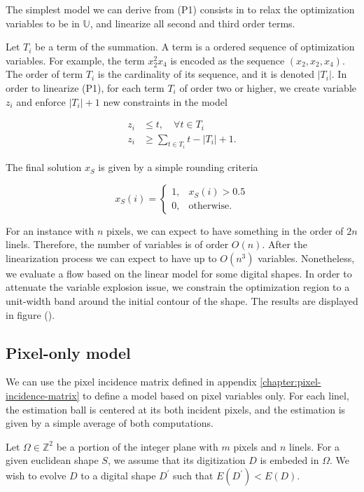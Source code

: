 	The simplest model we can derive from (P1) consists in to relax the optimization variables to be in $\mathbb{U}$, and linearize all second and third order terms. 
	
	Let $T_i$ be a term of the summation. A term is a ordered sequence of optimization variables. For example, the term $x_2^2x_4$ is encoded as the sequence $(x_2,x_2,x_4)$. The order of term $T_i$ is the cardinality of its sequence, and it is denoted $|T_i|$. In order to linearize (P1), for each term $T_i$ of order two or higher, we create variable $z_i$ and enforce $|T_i|+1$ new constraints in the model
	
	\begin{align*}
		z_i &\leq t, \quad \forall t \in T_i \\
		z_i &\geq \sum_{t \in T_i}{t} - |T_i| + 1.		
	\end{align*}

	The final solution $x_S$ is given by a simple rounding criteria
	
\[
	x_S(i) = \left\{ \begin{array}{ll}

		 	1,& x_S(i) > 0.5\\
		 	0,& \text{otherwise}.
 	
	\end{array}\right.
\]	

	For an instance with $n$ pixels, we can expect to have something in the order of $2n$ linels. Therefore, the number of variables is of order $O(n)$. After the linearization process we can expect to have up to $O(n^3)$ variables. Nonetheless, we evaluate a flow based on the linear model for some digital shapes. In order to attenuate the variable explosion issue, we constrain the optimization region to a unit-width band around the initial contour of the shape. The results are displayed in figure ().
	


\subsection{Pixel-only model}

We can use the pixel incidence matrix defined in appendix \ref{chapter:pixel-incidence-matrix} to define a model based on pixel variables only. For each linel, the estimation ball is centered at its both incident pixels, and the estimation is given by a simple average of both computations. 

Let $\Omega \in \mathbb{Z}^2$ be a portion of the integer plane with $m$ pixels and $n$ linels. For a given euclidean shape $S$, we assume that its digitization $D$ is embeded in $\Omega$. We wish to evolve $D$ to a digital shape $D^\prime$ such that $E(D^\prime) < E(D)$.

